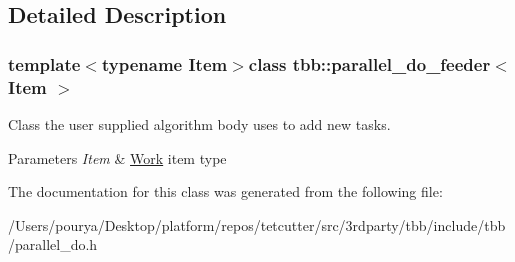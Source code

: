 \subsection{Detailed Description}
\subsubsection*{template$<$typename Item$>$class tbb\+::parallel\+\_\+do\+\_\+feeder$<$ Item $>$}

Class the user supplied algorithm body uses to add new tasks. 


\begin{DoxyParams}{Parameters}
{\em Item} & \hyperlink{structWork}{Work} item type \\
\hline
\end{DoxyParams}


The documentation for this class was generated from the following file\+:\begin{DoxyCompactItemize}
\item 
/\+Users/pourya/\+Desktop/platform/repos/tetcutter/src/3rdparty/tbb/include/tbb/parallel\+\_\+do.\+h\end{DoxyCompactItemize}
